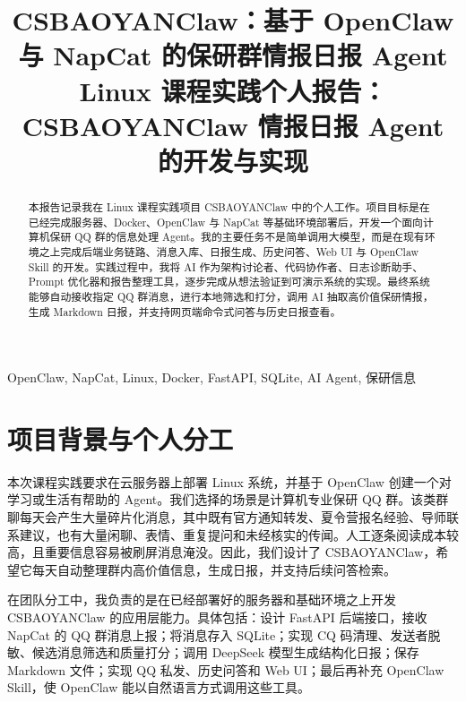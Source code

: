 \documentclass[conference]{IEEEtran}
\begin{document}
\title{CSBAOYANClaw：基于 OpenClaw 与 NapCat 的保研群情报日报 Agent\\
{\footnotesize Linux 课程实践个人报告：CSBAOYANClaw 情报日报 Agent 的开发与实现}
}

\author{
}

\maketitle

\begin{abstract}
本报告记录我在 Linux 课程实践项目 CSBAOYANClaw 中的个人工作。项目目标是在已经完成服务器、Docker、OpenClaw 与 NapCat 等基础环境部署后，开发一个面向计算机保研 QQ 群的信息处理 Agent。我的主要任务不是简单调用大模型，而是在现有环境之上完成后端业务链路、消息入库、日报生成、历史问答、Web UI 与 OpenClaw Skill 的开发。实践过程中，我将 AI 作为架构讨论者、代码协作者、日志诊断助手、Prompt 优化器和报告整理工具，逐步完成从想法验证到可演示系统的实现。最终系统能够自动接收指定 QQ 群消息，进行本地筛选和打分，调用 AI 抽取高价值保研情报，生成 Markdown 日报，并支持网页端命令式问答与历史日报查看。
\end{abstract}

\begin{IEEEkeywords}
OpenClaw, NapCat, Linux, Docker, FastAPI, SQLite, AI Agent, 保研信息
\end{IEEEkeywords}

\section{项目背景与个人分工}

本次课程实践要求在云服务器上部署 Linux 系统，并基于 OpenClaw 创建一个对学习或生活有帮助的 Agent。我们选择的场景是计算机专业保研 QQ 群。该类群聊每天会产生大量碎片化消息，其中既有官方通知转发、夏令营报名经验、导师联系建议，也有大量闲聊、表情、重复提问和未经核实的传闻。人工逐条阅读成本较高，且重要信息容易被刷屏消息淹没。因此，我们设计了 CSBAOYANClaw，希望它每天自动整理群内高价值信息，生成日报，并支持后续问答检索。

在团队分工中，我负责的是在已经部署好的服务器和基础环境之上开发 CSBAOYANClaw 的应用层能力。具体包括：设计 FastAPI 后端接口，接收 NapCat 的 QQ 群消息上报；将消息存入 SQLite；实现 CQ 码清理、发送者脱敏、候选消息筛选和质量打分；调用 DeepSeek 模型生成结构化日报；保存 Markdown 文件；实现 QQ 私发、历史问答和 Web UI；最后再补充 OpenClaw Skill，使 OpenClaw 能以自然语言方式调用这些工具。
\end{document}
